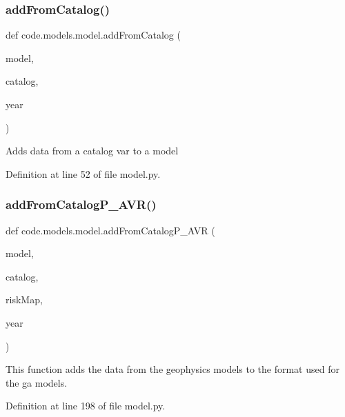 \subsubsection{\texorpdfstring{add\+From\+Catalog()}{addFromCatalog()}}
{\footnotesize\ttfamily def code.\+models.\+model.\+add\+From\+Catalog (\begin{DoxyParamCaption}\item[{}]{model,  }\item[{}]{catalog,  }\item[{}]{year }\end{DoxyParamCaption})}

\begin{DoxyVerb}Adds data from a catalog var to a model
\end{DoxyVerb}
 

Definition at line 52 of file model.\+py.

\mbox{\label{namespacecode_1_1models_1_1model_ad191be2a9a695565c7e247a98bb0a795}} 
\subsubsection{\texorpdfstring{add\+From\+Catalog\+P\+\_\+\+A\+V\+R()}{addFromCatalogP\_AVR()}}
{\footnotesize\ttfamily def code.\+models.\+model.\+add\+From\+Catalog\+P\+\_\+\+A\+VR (\begin{DoxyParamCaption}\item[{}]{model,  }\item[{}]{catalog,  }\item[{}]{risk\+Map,  }\item[{}]{year }\end{DoxyParamCaption})}

\begin{DoxyVerb}This function adds the data from the geophysics models to the format used for the ga models.
\end{DoxyVerb}
 

Definition at line 198 of file model.\+py.

\mbox{\label{namespacecode_1_1models_1_1model_aff45090e2bdcb7f7a6dcc6ae34007cb2}} 
